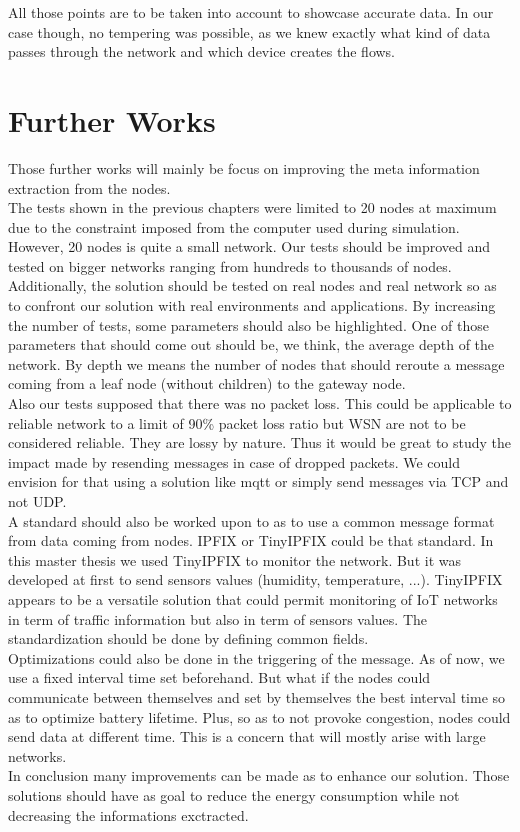 All those points are to be taken into account to showcase accurate data. In our case though, no tempering was possible, as we knew exactly what kind of data passes through the network and which device creates the flows.

\section{Further Works}

Those further works will mainly be focus on improving the meta information extraction from the nodes.\\

 The tests shown in the previous chapters were limited to 20 nodes at maximum due to the constraint imposed from the computer used during simulation. However, 20 nodes is quite a small network. Our tests should be improved and tested on bigger networks ranging from hundreds to thousands of nodes. Additionally, the solution should be tested on real nodes and real network so as to confront our solution with real environments and applications. By increasing the number of tests, some parameters should also be highlighted. One of those parameters that should come out should be, we think, the average depth of the network. By depth we means the number of nodes that should reroute a message coming from a leaf node (without children) to the gateway node.\\

 Also our tests supposed that there was no packet loss. This could be applicable to reliable network to a limit of 90\% packet loss ratio but WSN are not to be considered reliable. They are lossy by nature. Thus it would be great to study the impact made by resending messages in case of dropped packets. We could envision for that using a solution like \acrshort{mqtt} \cite{website:mqtt} or simply send messages via TCP and not UDP.\\

A standard should also be worked upon to as to use a common message format from data coming from nodes. IPFIX or TinyIPFIX could be that standard. In this master thesis we used TinyIPFIX to monitor the network. But it was developed at first to send sensors values (humidity, temperature, ...). TinyIPFIX appears to be a versatile solution that could permit monitoring of IoT networks in term of traffic information but also in term of sensors values. The standardization should be done by defining common fields.\\

Optimizations could also be done in the triggering of the message. As of now, we use a fixed interval time set beforehand. But what if the nodes could communicate between themselves and set by themselves the best interval time so as to optimize battery lifetime. Plus, so as to not provoke congestion, nodes could send data at different time. This is a concern that will mostly arise with large networks.\\

In conclusion many improvements can be made as to enhance our solution. Those solutions should have as goal to reduce the energy consumption while not decreasing the informations exctracted.
